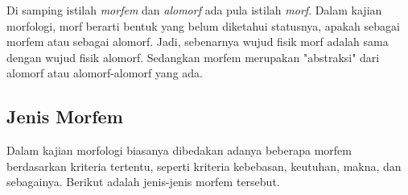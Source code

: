 Di samping istilah \textit{morfem} dan \textit{alomorf} ada pula istilah \textit{morf}. Dalam kajian morfologi, morf berarti bentuk yang belum diketahui statusnya, apakah sebagai morfem atau sebagai alomorf. Jadi, sebenarnya wujud fisik morf adalah sama dengan wujud fisik alomorf. Sedangkan morfem merupakan "abstraksi" dari alomorf atau alomorf-alomorf yang ada. 


\subsection{Jenis Morfem}
\label{sec:jenisMorfem}

Dalam kajian morfologi biasanya dibedakan adanya beberapa morfem berdasarkan kriteria tertentu, seperti kriteria kebebasan, keutuhan, makna, dan sebagainya. Berikut adalah jenis-jenis morfem tersebut.

